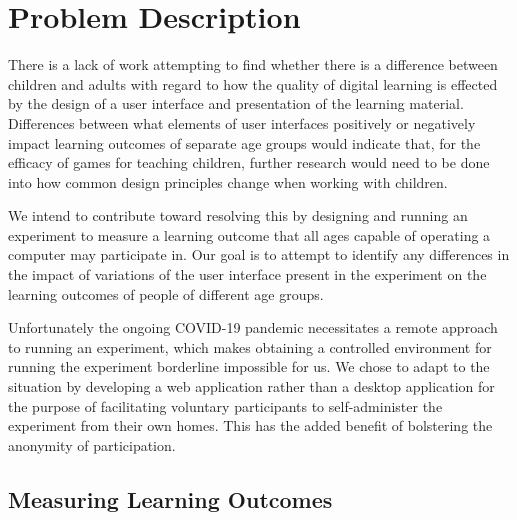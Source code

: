\documentclass[12pt]{report}
\begin{document}
\clearpage


\setcounter{page}{1}

% 
%

% 

\chapter{Problem Description}

There is a lack of work attempting to find whether there is a difference between children and adults with regard to how the quality of digital learning is effected by the design of a user interface and presentation of the learning material. Differences between what elements of user interfaces positively or negatively impact learning outcomes of separate age groups would indicate that, for the efficacy of games for teaching children, further research would need to be done into how common design principles change when working with children.

We intend to contribute toward resolving this by designing and running an experiment to measure a learning outcome that all ages capable of operating a computer may participate in. Our goal is to attempt to identify any differences in the impact of variations of the user interface present in the experiment on the learning outcomes of people of different age groups.

Unfortunately the ongoing COVID-19 pandemic necessitates a remote approach to running an experiment, which makes obtaining a controlled environment for running the experiment borderline impossible for us. We chose to adapt to the situation by developing a web application rather than a desktop application for the purpose of facilitating voluntary participants to self-administer the experiment from their own homes. This has the added benefit of bolstering the anonymity of participation.

\section{Measuring Learning Outcomes}
\end{document}
